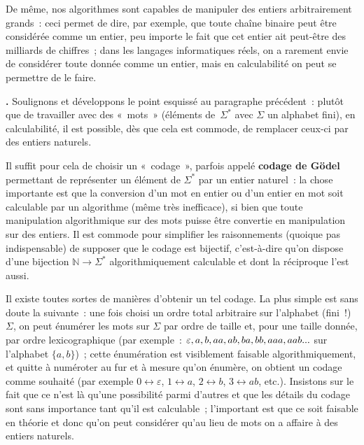 \documentclass[12pt,a4paper]{article}
\theoremstyle{definition}
\newcommand\thingy{%
\refstepcounter{comcnt}\medskip\noindent\textbf{\thecomcnt.} }
\newcommand{\defin}[2][]{\def\latexsucks{#1}\ifx\latexsucks\empty\index{#2}\else\index{\latexsucks}\fi\textbf{#2}}
\begin{document}
\smallskip

De même, nos algorithmes sont capables de manipuler des entiers
arbitrairement grands : ceci permet de dire, par exemple, que toute
chaîne binaire peut être considérée comme un entier, peu importe le
fait que cet entier ait peut-être des milliards de chiffres ; dans les
langages informatiques réels, on a rarement envie de considérer toute
donnée comme un entier, mais en calculabilité on peut se permettre de
le faire.

\thingy\label{computability-all-data-are-integers} Soulignons et
développons le point esquissé au paragraphe précédent : plutôt que de
travailler avec des « mots » (éléments de $\Sigma^*$ avec $\Sigma$ un
alphabet fini), en calculabilité, il est possible, dès que cela est
commode, de remplacer ceux-ci par des entiers naturels.

Il suffit pour cela de choisir un « codage », parfois appelé
\defin{codage de Gödel}
permettant de représenter un élément de
$\Sigma^*$ par un entier naturel : la chose importante est que la
conversion d'un mot en entier ou d'un entier en mot soit calculable
par un algorithme (même très inefficace), si bien que toute
manipulation algorithmique sur des mots puisse être convertie en
manipulation sur des entiers.  Il est commode pour simplifier les
raisonnements (quoique pas indispensable) de supposer que le codage
est bijectif, c'est-à-dire qu'on dispose d'une bijection $\mathbb{N}
\to \Sigma^*$ algorithmiquement calculable et dont la réciproque l'est
aussi.

Il existe toutes sortes de manières d'obtenir un tel codage.  La plus
simple est sans doute la suivante : une fois choisi un ordre total
arbitraire sur l'alphabet (fini !) $\Sigma$, on peut énumérer les mots
sur $\Sigma$ par ordre de taille et, pour une taille donnée, par ordre
lexicographique (par exemple : $\varepsilon, a, b,\penalty0 aa, ab,
ba, bb, aaa, aab...$ sur l'alphabet $\{a,b\}$) ; cette énumération est
visiblement faisable algorithmiquement, et quitte à numéroter au fur
et à mesure qu'on énumère, on obtient un codage comme souhaité (par
exemple $0 \leftrightarrow\varepsilon$, $1 \leftrightarrow a$, $2
\leftrightarrow b$, $3 \leftrightarrow ab$, etc.).  Insistons sur le
fait que ce n'est là qu'une possibilité parmi d'autres et que les
détails du codage sont sans importance tant qu'il est calculable ;
l'important est que ce soit faisable en théorie et donc qu'on peut
considérer qu'au lieu de mots on a affaire à des entiers naturels.
\end{document}
